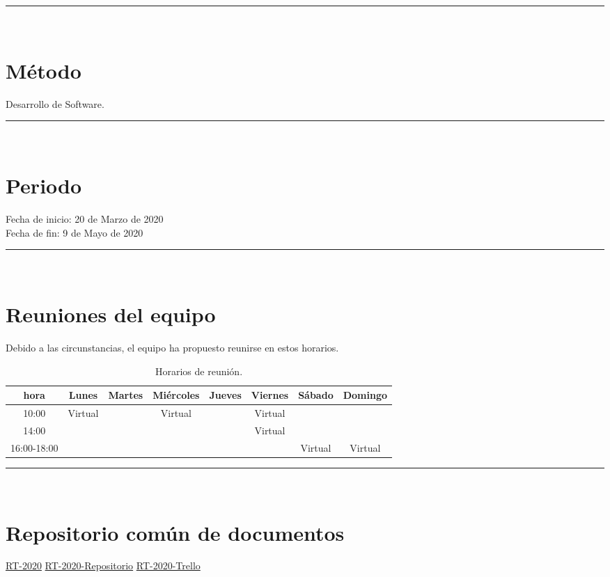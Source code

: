 \documentclass{article}
\begin{document}
\rule{0.8\textwidth}{.8pt}\\

\section*{Método} Desarrollo de Software.


\rule{0.8\textwidth}{.8pt}\\

\section*{Periodo}
Fecha de inicio: 20 de Marzo de 2020\\
\indent Fecha de fin: 9 de Mayo de 2020\\

\rule{0.8\textwidth}{.8pt}\\

\section*{Reuniones del equipo}

Debido a las circunstancias, el equipo ha propuesto reunirse en estos horarios.
\begin{center}
  \begin{table}[H]
    \centering
    \begin{tabular}{| c | c | c | c | c | c | c | c | }
      \hline
      hora & Lunes & Martes & Miércoles & Jueves & Viernes & Sábado & Domingo \\
      \hline
      10:00 & Virtual & & Virtual & & Virtual & & \\ \hline
      14:00 & & & & & Virtual & & \\ \hline
      16:00-18:00 & & & & &  & Virtual & Virtual\\ \hline    
    \end{tabular}
    \caption{Horarios de reunión.}
    \label{tabla:horarios}
  \end{table}
\end{center}

\rule{0.8\textwidth}{.8pt}\\

\section*{Repositorio común de documentos}
\href{https://drive.google.com/open?id=13f9jp3Oli6AQF1Ap8VhoEKFXTPULumos}{RT-2020}
\href{https://github.com/mildewyPrawn/CafeCiencias}{RT-2020-Repositorio}
\href{}{RT-2020-Trello}
\end{document}
